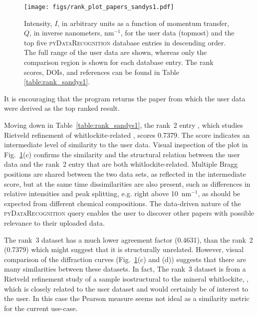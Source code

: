 \documentclass[preprint]{iucr}
\newcommand{\fig}[1]{Fig.~\ref{fig:#1}}
\newcommand{\tabl}[1]{Table~\ref{table:#1}}
\newcommand{\pydr}{\textsc{pyDataRecognition}\xspace}
\begin{document}
%
\begin{figure}
    \texttt{[image: figs/rank\_plot\_papers\_sandys1.pdf]}
    \label{fig:rank_plot_sandys1}
    \caption{Intensity, $I$, in arbitrary units as a function of momentum transfer, $Q$, in inverse nanometers, $\mathrm{nm}^{-1}$, for the user data (topmost) and the top five \pydr database entries in descending order.
    The full range of the user data are shown, whereas only the comparison region is shown for each database entry.
    The rank scores, DOIs, and references can be found in Table \ref{table:rank_sandys1}.}
\end{figure}
%
It is encouraging that the program returns the paper from which the user data were derived as the top ranked result. 

Moving down in \tabl{rank_sandys1}, the rank~2 entry \cite{zatovskyRietveldRefinementWhitlockiterelated2010}, which studies Rietveld refinement of whitlockite-related , scores 0.7379. The score indicates an intermediate level of similarity to the user data.  Visual inspection of the plot in \fig{rank_plot_sandys1}(c) confirms the similarity and the structural relation between the user data and the rank~2 entry that are both whitlockite-related. Multiple Bragg positions are shared between the two data sets, as reflected in the intermediate score, but at the same time dissimilarities are also present, such as differences in relative intensities and peak splitting, e.g. right above 10~nm$^{-1}$, as should be expected from different chemical compositions. The data-driven nature of the \pydr query enables the user to discover other papers with possible relevance to their uploaded data. 

The rank~3 dataset has a much lower agreement factor (0.4631), than the rank~2 (0.7379) which might suggest that it is structurally unrelated.  However, visual comparison of the diffraction curves (\fig{rank_plot_sandys1}(c) and (d)) suggests that there are many similarities between these datasets.  In fact, The rank~3 dataset \cite{strutynskaRietveldRefinementAgCa102013} is from a Rietveld refinement study of  a sample isostructural to the mineral whitlockite, , which is closely related to the user dataset and would certainly be of interest to the user. In this case the Pearson measure seems not ideal as a similarity metric for the current use-case.
\end{document}
